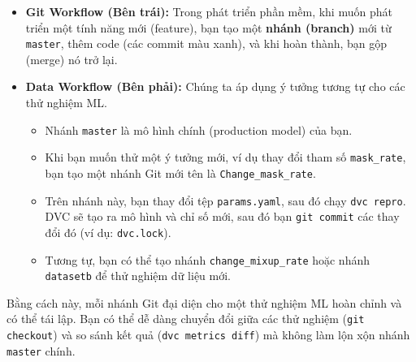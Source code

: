 \documentclass[11pt]{article}
\begin{document}
\begin{itemize}
    \item \textbf{Git Workflow (Bên trái):} Trong phát triển phần mềm, khi muốn phát triển một tính năng mới (feature), bạn tạo một \textbf{nhánh (branch)} mới từ \texttt{master}, thêm code (các commit màu xanh), và khi hoàn thành, bạn gộp (merge) nó trở lại.

    \item \textbf{Data Workflow (Bên phải):} Chúng ta áp dụng ý tưởng tương tự cho các thử nghiệm ML.
    \begin{itemize}
        \item Nhánh \texttt{master} là mô hình chính (production model) của bạn.
        \item Khi bạn muốn thử một ý tưởng mới, ví dụ thay đổi tham số \texttt{mask_rate}, bạn tạo một nhánh Git mới tên là \texttt{Change\_mask\_rate}.
        \item Trên nhánh này, bạn thay đổi tệp \texttt{params.yaml}, sau đó chạy \texttt{dvc repro}. DVC sẽ tạo ra mô hình và chỉ số mới, sau đó bạn \texttt{git commit} các thay đổi đó (ví dụ: \texttt{dvc.lock}).
        \item Tương tự, bạn có thể tạo nhánh \texttt{change\_mixup\_rate} hoặc nhánh \texttt{datasetb} để thử nghiệm dữ liệu mới.
    \end{itemize}
\end{itemize}
Bằng cách này, mỗi nhánh Git đại diện cho một thử nghiệm ML hoàn chỉnh và có thể tái lập. Bạn có thể dễ dàng chuyển đổi giữa các thử nghiệm (\texttt{git checkout}) và so sánh kết quả (\texttt{dvc metrics diff}) mà không làm lộn xộn nhánh \texttt{master} chính.

\printbibliography %
\end{document}
